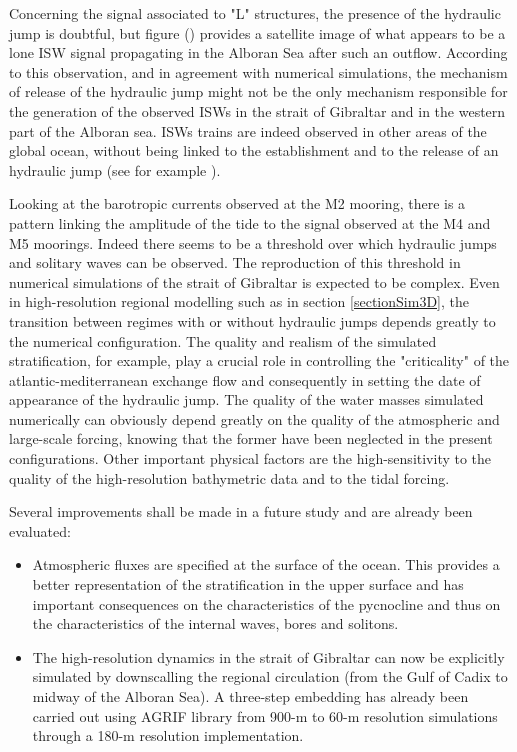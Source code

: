 Concerning the signal associated to "L" structures, the presence of the hydraulic jump is doubtful, but figure () provides a satellite image of what appears to be a lone ISW signal propagating in the Alboran Sea after such an outflow. According to this observation, and in agreement with numerical simulations, the mechanism of release of the hydraulic jump might not be the only mechanism responsible for the generation of the observed ISWs in the strait of Gibraltar and in the western part of the Alboran sea. ISWs trains are indeed observed in other areas of the global ocean, without being linked to the establishment and to the release of an hydraulic jump (see for example \citet{chen_2017}).

Looking at the barotropic currents observed at the M2 mooring, there is a pattern linking the amplitude of the tide to the signal observed at the M4 and M5 moorings. Indeed there seems to be a threshold over which hydraulic jumps and solitary waves can be observed. The reproduction of this threshold in numerical simulations of the strait of Gibraltar is expected to be complex. Even in high-resolution regional modelling such as in section \ref{sectionSim3D}, the transition between regimes with or without hydraulic jumps depends greatly to the numerical configuration. The quality and realism of the simulated stratification, for example, play a crucial role in controlling the "criticality" of the atlantic-mediterranean exchange flow and consequently in setting the date of appearance of the hydraulic jump. The quality of the water masses simulated numerically can obviously depend greatly on the quality of the atmospheric and large-scale forcing, knowing that the former have been neglected in the present configurations. Other important physical factors are the high-sensitivity to the quality of the high-resolution bathymetric data and to the tidal forcing.

Several improvements shall be made in a future study and are already been evaluated: 
\begin{itemize}
\item Atmospheric fluxes are specified at the surface of the ocean.  This provides a better representation of the stratification in the upper surface and has important consequences on the characteristics of the pycnocline and thus on the characteristics of the internal waves, bores and solitons.
\item The high-resolution dynamics in the strait of Gibraltar can now be explicitly simulated by downscalling the regional circulation (from the Gulf of Cadix to midway of the Alboran Sea). A three-step embedding has already been carried out using AGRIF library from 900-m to 60-m resolution simulations through a 180-m resolution implementation.
\end{itemize}
 




